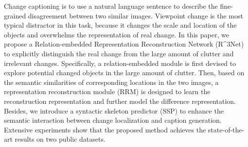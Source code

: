 Change captioning is to use a natural language sentence to describe the fine-grained disagreement between two similar images. Viewpoint change is the most typical distractor in this task, because it changes the scale and location of the objects and overwhelms the representation of real change. In this paper, we propose a Relation-embedded Representation Reconstruction Network (R^3Net) to explicitly distinguish the real change from the large amount of clutter and irrelevant changes. Specifically, a relation-embedded module is first devised to explore potential changed objects in the large amount of clutter. Then, based on the semantic similarities of corresponding locations in the two images, a representation reconstruction module (RRM) is designed to learn the reconstruction representation and further model the difference representation. Besides, we introduce a syntactic skeleton predictor (SSP) to enhance the semantic interaction between change localization and caption generation. Extensive experiments show that the proposed method achieves the state-of-the-art results on two public datasets.
